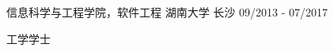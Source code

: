 \begin{cventries}
  \cventry
    {信息科学与工程学院，软件工程}
    {湖南大学}
    {长沙}
    {09/2013 - 07/2017}
    {
      \begin{cvitems}
        \item {工学学士}
      \end{cvitems}
    }
\end{cventries}
